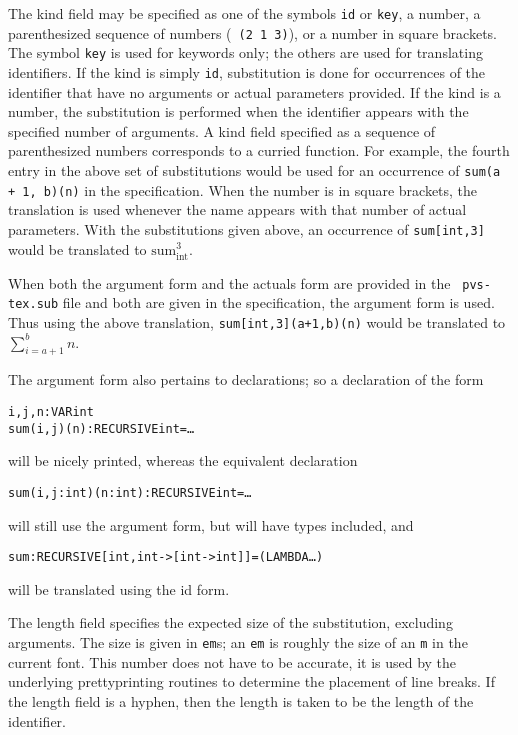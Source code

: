 The kind field may be specified as one of the symbols \texttt{id} or
\texttt{key}, a number, a parenthesized sequence of numbers (\eg\ {\tt (2
1 3)}), or a number in square brackets.  The symbol \texttt{key} is used
for keywords only; the others are used for translating identifiers.  If
the kind is simply \texttt{id}, substitution is done for occurrences of
the identifier that have no arguments or actual
parameters provided.  If the kind is a number, the
substitution is performed when the identifier appears with the specified
number of arguments.  A kind field specified as a sequence of
parenthesized numbers corresponds to a curried function.  For example, the
fourth entry in the above set of substitutions would be used for an
occurrence of \texttt{sum(a + 1, b)(n)} in the specification.  When the
number is in square brackets, the translation is used whenever the name
appears with that number of actual parameters.  With the substitutions
given above, an occurrence of \texttt{sum[int,3]} would be translated to
$\textrm{sum}_{\textrm{int}}^{3}$.

When both the argument form and the actuals form are provided in the {\tt
pvs-tex.sub} file and both are given in the specification, the argument
form is used.  Thus using the above translation,
\texttt{sum[int,3](a+1,b)(n)} would be translated to $\sum_{i={a+1}}^{b}
n$.

The argument form also pertains to declarations; so a declaration of the
form
\begin{alltt}
  i,j,n: VAR int
  sum(i,j)(n): RECURSIVE int = \ldots
\end{alltt}
will be nicely printed, whereas the equivalent declaration
\begin{alltt}
  sum(i,j:int)(n:int): RECURSIVE int = \ldots
\end{alltt}
will still use the argument form, but will have types included, and
\begin{alltt}
  sum: RECURSIVE [int, int -> [int -> int]] = (LAMBDA \ldots )
\end{alltt}
will be translated using the id form.

The length field specifies the expected size of the substitution,
excluding arguments.  The size is given in \texttt{em}s; an \texttt{em} is
roughly the size of an \texttt{m} in the current font.  This number does not
have to be accurate, it is used by the underlying prettyprinting routines
to determine the placement of line breaks.  If the length field is a
hyphen, then the length is taken to be the length of the identifier.

